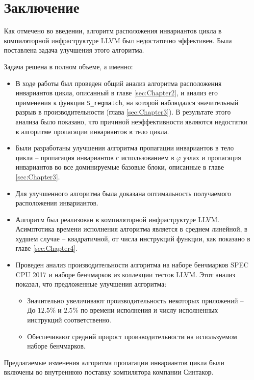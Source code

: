 \chapter*{Заключение}

Как отмечено во введении, алгоритм расположения инвариантов цикла в компиляторной инфраструктуре LLVM был недостаточно эффективен.
Была поставлена задача улучшения этого алгоритма.

Задача решена в полном объеме, а именно:
\begin{itemize}
    \item В ходе работы был проведен общий анализ алгоритма расположения инвариантов цикла, описанный в главе \ref{sec:Chapter2}, и анализ его применения к функции \texttt{S\_regmatch}, на которой наблюдался значительный разрыв в производительности (глава \ref{sec:Chapter3}). В результате этого анализа было показано, что причиной неэффективности являются недостатки в алгоритме пропагации инвариантов в тело цикла.
    \item Были разработаны улучшения алгоритма пропагации инвариантов в тело цикла -- пропагация инвариантов с использованием в $\varphi$ узлах и пропагация инвариантов во все доминируемые базовые блоки, описанные в главе \ref{sec:Chapter3}.
    \item Для улучшенного алгоритма была доказана оптимальность получаемого расположения инвариантов.
    \item Алгоритм был реализован в компиляторной инфраструктуре LLVM.
        Асимптотика времени исполнения алгоритма является в среднем линейной, в худшем случае -- квадратичной, от числа инструкций функции, как показано в главе \ref{sec:Chapter4}.
    \item Проведен анализ производительности алгоритма на наборе бенчмарков SPEC CPU\textsuperscript{\tiny\textregistered} 2017 и наборе бенчмарков из коллекции тестов LLVM.
        Этот анализ показал, что предложенные улучшения алгоритма:
        \begin{itemize}
            \item Значительно увеличивают производительность некоторых приложений --
                До $12.5\%$ и $2.5\%$ по времени исполнения и числу исполненных инструкций соответственно.
            \item Обеспечивают средний прирост производительности на используемом наборе бенчмарков.
        \end{itemize}
\end{itemize}

Предлагаемые изменения алгоритма пропагации инвариантов цикла были включены во внутреннюю поставку компилятора компании Синтакор.

\newpage
